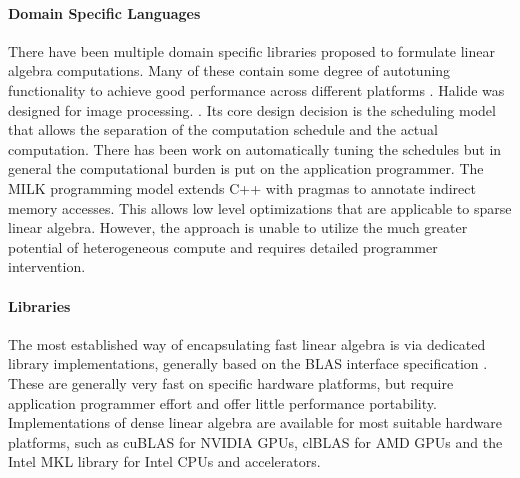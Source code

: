 \paragraph*{Domain Specific Languages}
There have been multiple domain specific libraries proposed to formulate linear
algebra computations.
Many of these contain some degree of autotuning functionality to achieve good
performance across different platforms
\cite{Sujeeth:2014:DCA:2601432.2584665}.
Halide %
\cite{Ragan-Kelley:2013:HLC:2499370.2462176}
was designed for image processing.
\cite{Suriana:2017:PAR:3049832.3049863}.
Its core design decision is the scheduling model that allows the separation of
the computation schedule and the actual computation.
There has been work on automatically tuning the schedules
\cite{Mullapudi:2016:ASH:2897824.2925952} but in general the computational
burden is put on the application programmer.
The MILK programming model \cite{Kiriansky:2016:OIM:2967938.2967948} extends C++
with pragmas to annotate indirect memory accesses.
This allows low level optimizations that are applicable to sparse linear
algebra.
However, the approach is unable to utilize
the much greater potential of heterogeneous compute and requires detailed
programmer intervention.

\paragraph*{Libraries}
    The most established way of encapsulating fast linear algebra is via
    dedicated library implementations, generally based on the BLAS interface
    specification \cite{2002:USB:567806.567807}.
    These are generally very fast on specific hardware platforms, but require
    application programmer effort and offer little performance portability.
    Implementations of dense linear algebra are available for most suitable
    hardware platforms, such as cuBLAS \cite{cublas} for NVIDIA GPUs, clBLAS
    \cite{clblas} for AMD GPUs and the Intel MKL library \cite{mkl} for Intel
    CPUs and accelerators.

